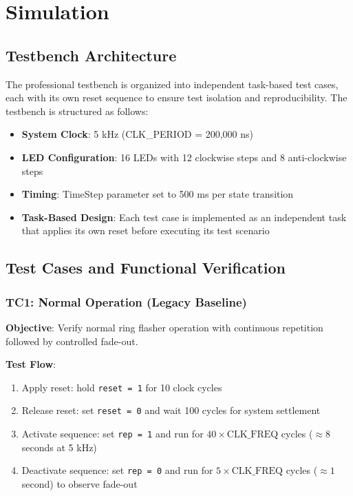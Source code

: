 \section{Simulation}

\subsection{Testbench Architecture}

The professional testbench is organized into independent task-based test cases, each with its own reset sequence to ensure test isolation and reproducibility. The testbench is structured as follows:

\begin{itemize}
    \item \textbf{System Clock}: 5 kHz (CLK\_PERIOD = 200,000 ns)
    \item \textbf{LED Configuration}: 16 LEDs with 12 clockwise steps and 8 anti-clockwise steps
    \item \textbf{Timing}: TimeStep parameter set to 500 ms per state transition
    \item \textbf{Task-Based Design}: Each test case is implemented as an independent task that applies its own reset before executing its test scenario
\end{itemize}

\subsection{Test Cases and Functional Verification}

\subsubsection{TC1: Normal Operation (Legacy Baseline)}

\textbf{Objective}: Verify normal ring flasher operation with continuous repetition followed by controlled fade-out.

\textbf{Test Flow}:
\begin{enumerate}
    \item Apply reset: hold \texttt{reset = 1} for 10 clock cycles
    \item Release reset: set \texttt{reset = 0} and wait 100 cycles for system settlement
    \item Activate sequence: set \texttt{rep = 1} and run for $40 \times \text{CLK\_FREQ}$ cycles ($\approx 8$ seconds at 5 kHz)
    \item Deactivate sequence: set \texttt{rep = 0} and run for $5 \times \text{CLK\_FREQ}$ cycles ($\approx 1$ second) to observe fade-out
\end{enumerate}

